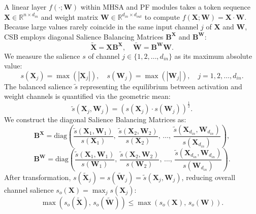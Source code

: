 \documentclass[10pt,a4paper]{article}
\begin{document}
A linear layer $f(\cdot; \mathbf{W})$ within MHSA and PF modules takes a token sequence $\mathbf{X} \in \mathbb{R}^{n \times d_{in}}$ and weight matrix $\mathbf{W} \in \mathbb{R}^{d_{in} \times d_{out}}$ to compute $f(\mathbf{X}; \mathbf{W}) = \mathbf{X} \cdot \mathbf{W}$. Because large values rarely coincide in the same input channel $j$ of $\mathbf{X}$ and $\mathbf{W}$, CSB employs diagonal Salience Balancing Matrices $\mathbf{B}^{\mathbf{X}}$ and $\mathbf{B}^{\mathbf{W}}$:
\begin{equation}
\widetilde{\mathbf{X}} = \mathbf{X}\mathbf{B}^{\mathbf{X}}, \quad \widetilde{\mathbf{W}} = \mathbf{B}^{\mathbf{W}}\mathbf{W}.
\label{eq:3}
\end{equation}
We measure the salience $s$ of channel $j \in \{1, 2, \ldots, d_{in}\}$ as its maximum absolute value:
\begin{equation}
s(\mathbf{X}_j) = \max(|\mathbf{X}_j|), \quad s(\mathbf{W}_j) = \max(|\mathbf{W}_j|), \quad j = 1, 2, \ldots, d_{in}.
\label{eq:4}
\end{equation}
The balanced salience $\widetilde{s}$ representing the equilibrium between activation and weight channels is quantified via the geometric mean:
\begin{equation}
\widetilde{s}(\mathbf{X}_j, \mathbf{W}_j) = \left(s(\mathbf{X}_j) \cdot s(\mathbf{W}_j)\right)^{\frac{1}{2}}.
\label{eq:5}
\end{equation}
We construct the diagonal Salience Balancing Matrices as:
\begin{equation}
\mathbf{B}^{\mathbf{X}} = \mathrm{diag}\!\left(\frac{\widetilde{s}(\mathbf{X}_1, \mathbf{W}_1)}{s(\mathbf{X}_1)},\, \frac{\widetilde{s}(\mathbf{X}_2, \mathbf{W}_2)}{s(\mathbf{X}_2)},\, \ldots,\, \frac{\widetilde{s}(\mathbf{X}_{d_{in}}, \mathbf{W}_{d_{in}})}{s(\mathbf{X}_{d_{in}})}\right),
\label{eq:6}
\end{equation}
\begin{equation}
\mathbf{B}^{\mathbf{W}} = \mathrm{diag}\!\left(\frac{\widetilde{s}(\mathbf{X}_1, \mathbf{W}_1)}{s(\mathbf{W}_1)},\, \frac{\widetilde{s}(\mathbf{X}_2, \mathbf{W}_2)}{s(\mathbf{W}_2)},\, \ldots,\, \frac{\widetilde{s}(\mathbf{X}_{d_{in}}, \mathbf{W}_{d_{in}})}{s(\mathbf{W}_{d_{in}})}\right).
\label{eq:7}
\end{equation}
After transformation, $s(\widetilde{\mathbf{X}}_j) = s(\widetilde{\mathbf{W}}_j) = \widetilde{s}(\mathbf{X}_j, \mathbf{W}_j)$, reducing overall channel salience $s_o(\mathbf{X}) = \max_j s(\mathbf{X}_j)$:
\begin{equation}
\max\!\left(s_o(\widetilde{\mathbf{X}}),\, s_o(\widetilde{\mathbf{W}})\right) \le \max\!\left(s_o(\mathbf{X}),\, s_o(\mathbf{W})\right).
\label{eq:8}
\end{equation}
\end{document}
